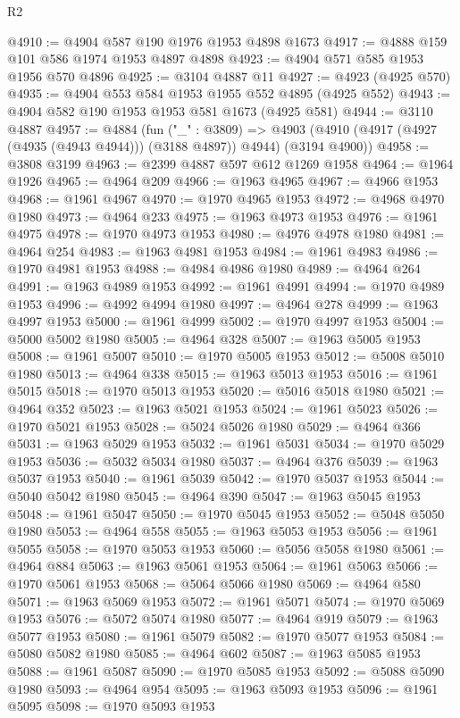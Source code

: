 \begin{lexlean}{R2}
\begin{coremodule}
@4910 := @4904 @587 @190 @1976 @1953 @4898 @1673
@4917 := @4888 @159 @101 @586 @1974 @1953 @4897 @4898
@4923 := @4904 @571 @585 @1953 @1956 @570 @4896
@4925 := @3104 @4887 @11
@4927 := @4923 (@4925 @570)
@4935 := @4904 @553 @584 @1953 @1955 @552 @4895 (@4925 @552)
@4943 := @4904 @582 @190 @1953 @1953 @581 @1673 (@4925 @581)
@4944 := @3110 @4887
@4957 := @4884
    (fun ("_" : @3809) =>
    @4903 (@4910 (@4917 (@4927 (@4935 (@4943 @4944))) (@3188 @4897)) @4944) (@3194 @4900))
@4958 := @3808 @3199
@4963 := @2399 @4887 @597 @612 @1269 @1958
@4964 := @1964 @1926
@4965 := @4964 @209
@4966 := @1963 @4965
@4967 := @4966 @1953
@4968 := @1961 @4967
@4970 := @1970 @4965 @1953
@4972 := @4968 @4970 @1980
@4973 := @4964 @233
@4975 := @1963 @4973 @1953
@4976 := @1961 @4975
@4978 := @1970 @4973 @1953
@4980 := @4976 @4978 @1980
@4981 := @4964 @254
@4983 := @1963 @4981 @1953
@4984 := @1961 @4983
@4986 := @1970 @4981 @1953
@4988 := @4984 @4986 @1980
@4989 := @4964 @264
@4991 := @1963 @4989 @1953
@4992 := @1961 @4991
@4994 := @1970 @4989 @1953
@4996 := @4992 @4994 @1980
@4997 := @4964 @278
@4999 := @1963 @4997 @1953
@5000 := @1961 @4999
@5002 := @1970 @4997 @1953
@5004 := @5000 @5002 @1980
@5005 := @4964 @328
@5007 := @1963 @5005 @1953
@5008 := @1961 @5007
@5010 := @1970 @5005 @1953
@5012 := @5008 @5010 @1980
@5013 := @4964 @338
@5015 := @1963 @5013 @1953
@5016 := @1961 @5015
@5018 := @1970 @5013 @1953
@5020 := @5016 @5018 @1980
@5021 := @4964 @352
@5023 := @1963 @5021 @1953
@5024 := @1961 @5023
@5026 := @1970 @5021 @1953
@5028 := @5024 @5026 @1980
@5029 := @4964 @366
@5031 := @1963 @5029 @1953
@5032 := @1961 @5031
@5034 := @1970 @5029 @1953
@5036 := @5032 @5034 @1980
@5037 := @4964 @376
@5039 := @1963 @5037 @1953
@5040 := @1961 @5039
@5042 := @1970 @5037 @1953
@5044 := @5040 @5042 @1980
@5045 := @4964 @390
@5047 := @1963 @5045 @1953
@5048 := @1961 @5047
@5050 := @1970 @5045 @1953
@5052 := @5048 @5050 @1980
@5053 := @4964 @558
@5055 := @1963 @5053 @1953
@5056 := @1961 @5055
@5058 := @1970 @5053 @1953
@5060 := @5056 @5058 @1980
@5061 := @4964 @884
@5063 := @1963 @5061 @1953
@5064 := @1961 @5063
@5066 := @1970 @5061 @1953
@5068 := @5064 @5066 @1980
@5069 := @4964 @580
@5071 := @1963 @5069 @1953
@5072 := @1961 @5071
@5074 := @1970 @5069 @1953
@5076 := @5072 @5074 @1980
@5077 := @4964 @919
@5079 := @1963 @5077 @1953
@5080 := @1961 @5079
@5082 := @1970 @5077 @1953
@5084 := @5080 @5082 @1980
@5085 := @4964 @602
@5087 := @1963 @5085 @1953
@5088 := @1961 @5087
@5090 := @1970 @5085 @1953
@5092 := @5088 @5090 @1980
@5093 := @4964 @954
@5095 := @1963 @5093 @1953
@5096 := @1961 @5095
@5098 := @1970 @5093 @1953

\end{coremodule}
\end{lexlean}
